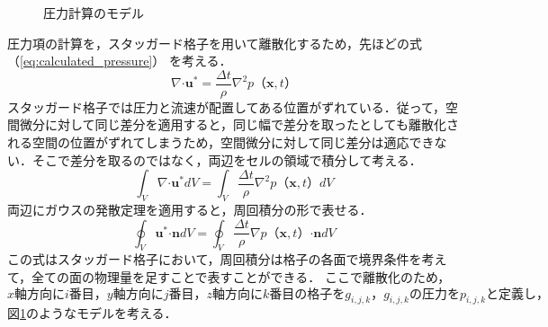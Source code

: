 \documentclass[a4j,12pt]{jreport}
\begin{document}
\begin{figure}[htbp]
\begin{center}
\caption{圧力計算のモデル}
\label{fig:pressure_model}
\end{center}
\end{figure}
圧力項の計算を，スタッガード格子を用いて離散化するため，先ほどの式 （\ref{eq:calculated_pressure}） を考える．
$$\nabla\boldsymbol{\cdot}\bm{u}^* = \frac{\varDelta t}{\rho}\nabla^2 p （\bm{x},t） $$
スタッガード格子では圧力と流速が配置してある位置がずれている．従って，空間微分に対して同じ差分を適用すると，同じ幅で差分を取ったとしても離散化される空間の位置がずれてしまうため，空間微分に対して同じ差分は適応できない．そこで差分を取るのではなく，両辺をセルの領域で積分して考える．
$$\int_V\nabla\boldsymbol{\cdot}\bm{u}^* dV= \int_V\frac{\varDelta t}{\rho}\nabla^2 p （\bm{x},t） dV$$
両辺にガウスの発散定理を適用すると，周回積分の形で表せる．
$$\oint_V\bm{u}^*\boldsymbol{\cdot}\bm{n} dV= \oint_V\frac{\varDelta t}{\rho}\nabla p （\bm{x},t） \boldsymbol{\cdot}\bm{n}dV$$
この式はスタッガード格子において，周回積分は格子の各面で境界条件を考えて，全ての面の物理量を足すことで表すことができる．
ここで離散化のため，$x軸方向にi番目，y軸方向にj番目，z軸方向にk番目の格子をg_{i,j,k}，g_{i,j,k}の圧力をp_{i,j,k}と定義し，$図\ref{fig:pressure_model}のようなモデルを考える．
\end{document}
